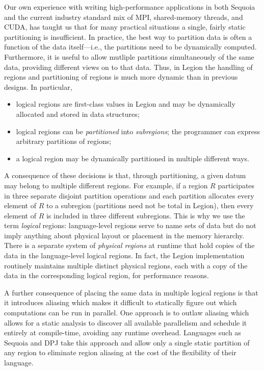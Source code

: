 Our own experience with writing high-performance applications in both 
Sequoia and the current industry standard mix of MPI, shared-memory
threads, and CUDA, has taught us that for many practical situations a
single, fairly static partitioning is insufficient.  In practice, the
best way to partition data is often a function of the data
itself---i.e., the partitions need to be dynamically computed.
Furthermore, it is useful to allow mutliple partitions simultaneously of
the same data, providing different views on to that data. Thus, in Legion the 
handling of regions and partitioning of regions is much more dynamic than in 
previous designs.  In particular,
\begin{itemize}
\item  logical regions are first-class values in Legion
and may be dynamically allocated and stored in data structures;

\item logical regions can be {\em partitioned} into {\em subregions}; the programmer can express arbitrary partitions of
regions;

\item  a logical region may be dynamically partitioned in multiple different ways.
\end{itemize}
A consequence of these decisions is that, through partitioning, a
given datum may belong to multiple different regions.  For example, if
a region $R$ participates in three separate disjoint partition
operations and each partition allocates every element of $R$ to a
subregion (partitions need not be total in Legion), then every element
of $R$ is included in three different subregions.  This is why we use
the term {\em logical} regions: language-level regions serve to name
sets of data but do not imply anything about physical layout or placement
in the memory hierarchy.  There
is a separate system of {\em physical regions} at runtime that hold
copies of the data in the language-level logical regions.  In fact,
the Legion implementation routinely maintains multiple distinct
physical regions, each with a copy of the data in the corresponding
logical region, for performance reasons.

A further consequence of placing the same data in multiple logical
regions is that it introduces aliasing which makes it difficult 
to statically figure out which computations can be run in parallel.  
One approach is to outlaw aliasing which allows for a static analysis
to discover all available parallelism and schedule it entirely at
compile-time, avoiding any runtime overhead.  Languages such as
Sequoia and DPJ take this approach and allow only a single static partition of any region 
to eliminate region aliasing at the cost of the flexibility of their language.

